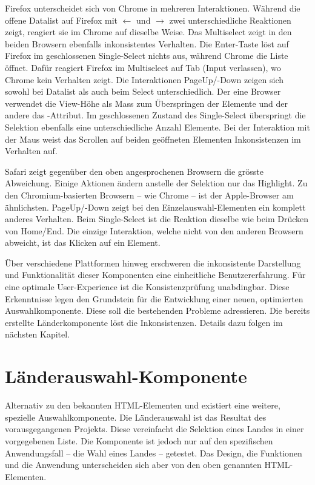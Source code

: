 Firefox unterscheidet sich von Chrome in mehreren Interaktionen. 
Während die offene Datalist auf Firefox mit $\leftarrow$ und $\rightarrow$ zwei unterschiedliche Reaktionen zeigt, reagiert sie im Chrome auf dieselbe Weise. 
Das Multiselect zeigt in den beiden Browsern ebenfalls inkonsistentes Verhalten. 
Die Enter-Taste löst auf Firefox im geschlossenen Single-Select nichts aus, während Chrome die Liste öffnet. 
Dafür reagiert Firefox im Multiselect auf Tab (Input verlassen), wo Chrome kein Verhalten zeigt. 
Die Interaktionen PageUp/-Down zeigen sich sowohl bei Datalist als auch beim Select unterschiedlich. 
Der eine Browser verwendet die View-Höhe als Mass zum Überspringen der Elemente und der andere das -Attribut. 
Im geschlossenen Zustand des Single-Select überspringt die Selektion ebenfalls eine unterschiedliche Anzahl Elemente. 
Bei der Interaktion mit der Maus weist das Scrollen auf beiden geöffneten Elementen Inkonsistenzen im Verhalten auf. 

Safari zeigt gegenüber den oben angesprochenen Browsern die grösste Abweichung. 
Einige Aktionen ändern anstelle der Selektion nur das Highlight. 
Zu den Chromium-basierten Browsern – wie Chrome – ist der Apple-Browser am ähnlichsten. 
PageUp/-Down zeigt bei den Einzelauswahl-Elementen ein komplett anderes Verhalten. 
Beim Single-Select ist die Reaktion dieselbe wie beim Drücken von Home/End. 
Die einzige Interaktion, welche nicht von den anderen Browsern abweicht, ist das Klicken auf ein Element. 

Über verschiedene Plattformen hinweg erschweren die inkonsistente Darstellung und Funktionalität dieser Komponenten eine einheitliche Benutzererfahrung. 
Für eine optimale User-Experience ist die Konsistenzprüfung unabdingbar. 
Diese Erkenntnisse legen den Grundstein für die Entwicklung einer neuen, optimierten Auswahlkomponente. 
Diese soll die bestehenden Probleme adressieren. 
Die bereits erstellte Länderkomponente löst die Inkonsistenzen. 
Details dazu folgen im nächsten Kapitel. 


\clearpage
\section{Länderauswahl-Komponente}
\label{sec:countryChoice}

Alternativ zu den bekannten HTML-Elementen  und  existiert eine weitere, spezielle Auswahlkomponente. 
Die Länderauswahl\citemarktext{
    [\cite{ip5}]
} ist das Resultat des vorausgegangenen Projekts. 
Diese vereinfacht die Selektion eines Landes in einer vorgegebenen Liste. 
Die Komponente ist jedoch nur auf den spezifischen Anwendungsfall – die Wahl eines Landes – getestet. 
Das Design, die Funktionen und die Anwendung unterscheiden sich aber von den oben genannten HTML-Elementen.


